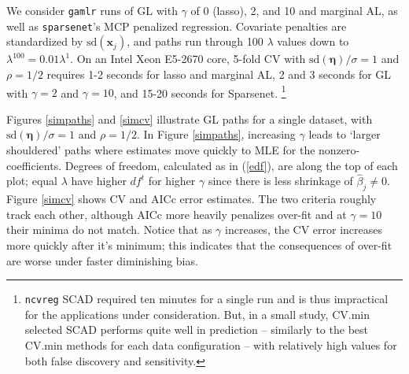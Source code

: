 \documentclass[12pt]{article}
\newcommand{\bs}[1]{\boldsymbol{#1}}
\newcommand{\mr}[1]{\mathrm{#1}}
\newcommand{\bm}[1]{\mathbf{#1}}
\begin{document}
We consider {\tt gamlr} runs of GL with $\gamma$
of 0 (lasso), 2, and 10 and marginal AL, as well as
{\tt sparsenet}'s MCP penalized regression.  Covariate penalties are
standardized by $\mr{sd}(\bs{x}_j)$, and paths run through 100
$\lambda$ values down to $\lambda^{100} = 0.01\lambda^1$. On an Intel Xeon
E5-2670 core, 5-fold CV with $\mr{sd}(\bm{\eta})/\sigma=1$
and $\rho=1/2$ requires   1-2 seconds for lasso and marginal  AL, 2 and 3
seconds for GL with $\gamma=2$ and $\gamma=10$, and 15-20 seconds
for Sparsenet.
\footnote{{\tt ncvreg} SCAD required ten minutes for a single run and is thus
impractical for the applications under consideration.  But, in a small study,
CV.min selected SCAD performs quite well in prediction --  similarly to the
best CV.min methods for each data configuration -- with relatively high values
for both false discovery and sensitivity. }


Figures \ref{simpaths} and \ref{simcv} illustrate GL paths for a single
dataset, with  $\mr{sd}(\bm{\eta})/\sigma=1$ and $\rho=1/2$. In Figure
\ref{simpaths}, increasing $\gamma$ leads to `larger shouldered' paths where
estimates move quickly to MLE for the nonzero-coefficients. Degrees of
freedom, calculated as in (\ref{edf}), are along the top of each plot; equal
$\lambda$ have higher $df^t$ for higher $\gamma$ since there is less shrinkage
of $\hat\beta_j\neq0$.  Figure \ref{simcv} shows CV and AICc error estimates.
The two criteria roughly track each other, although AICc more heavily
penalizes over-fit and at $\gamma=10$ their minima do not match.  Notice that
as $\gamma$ increases, the CV error increases more quickly after it's minimum;
this indicates that the consequences of over-fit are worse under faster
diminishing bias.
\end{document}
